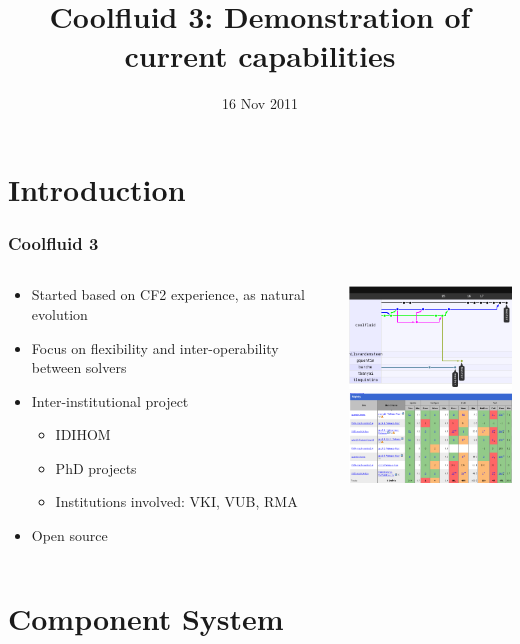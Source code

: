 \documentclass{beamer}
\title[CF3 demo]{Coolfluid 3: Demonstration of current capabilities}
\date{16 Nov 2011}
\begin{document}
\section{Introduction}

\begin{frame}
 \frametitle{Coolfluid 3}
\begin{columns}
\begin{column}{5cm}
\begin{itemize}
 \item Started based on CF2 experience, as natural evolution
 \item Focus on flexibility and inter-operability between solvers
 \item Inter-institutional project
 \begin{itemize}
  \item IDIHOM
  \item PhD projects
  \item Institutions involved: VKI, VUB, RMA
 \end{itemize}
\item Open source
\end{itemize}
\end{column}
\begin{column}{5cm}
\begin{center}
 \includegraphics[width=5cm]{figs/github}\\
\includegraphics[width=5cm]{figs/dash}
\end{center}
\end{column}
\end{columns}
\end{frame}

\section{Component System}
\end{document}
